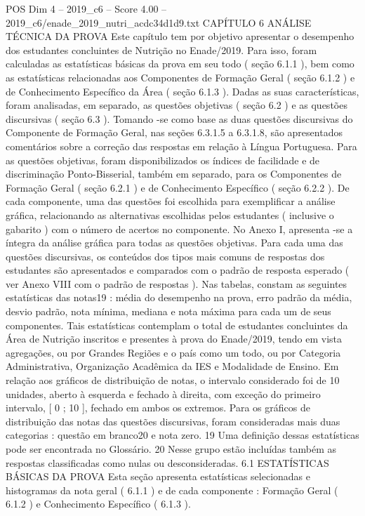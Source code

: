 \begin{textsample}{POS Dim 4 – 2019\_c6 – Score 4.00 – 2019\_c6/enade\_2019\_nutri\_acdc34d1d9.txt}  \label{ex:f4_pos_091}
CAPÍTULO 6 ANÁLISE TÉCNICA DA PROVA Este capítulo tem por objetivo apresentar o desempenho dos estudantes concluintes de Nutrição no Enade/2019.
Para isso, foram calculadas as estatísticas básicas da prova em seu todo ( seção 6.1.1 ), bem como as estatísticas relacionadas aos Componentes de Formação Geral ( seção 6.1.2 ) e de Conhecimento Específico da Área ( seção 6.1.3 ).
Dadas as suas características, foram analisadas, em separado, as questões objetivas ( seção 6.2 ) e as questões discursivas ( seção 6.3 ).
Tomando -se como base as duas questões discursivas do Componente de Formação Geral, nas seções 6.3.1.5 a 6.3.1.8, são apresentados comentários sobre a correção das respostas em relação à Língua Portuguesa.
Para as questões objetivas, foram disponibilizados os índices de facilidade e de discriminação Ponto-Bisserial, também em separado, para os Componentes de Formação Geral ( seção 6.2.1 ) e de Conhecimento Específico ( seção 6.2.2 ).
De cada componente, uma das questões foi escolhida para exemplificar a análise gráfica, relacionando as alternativas escolhidas pelos estudantes ( inclusive o gabarito ) com o número de acertos no componente.
No Anexo I, apresenta -se a íntegra da análise gráfica para todas as questões objetivas.
Para cada uma das questões discursivas, os conteúdos dos tipos mais comuns de respostas dos estudantes são apresentados e comparados com o padrão de resposta esperado ( ver Anexo VIII com o padrão de respostas ).
Nas tabelas, constam as seguintes estatísticas das notas19 : média do desempenho na prova, erro padrão da média, desvio padrão, nota mínima, mediana e nota máxima para cada um de seus componentes.
Tais estatísticas contemplam o total de estudantes concluintes da Área de Nutrição inscritos e presentes à prova do Enade/2019, tendo em vista agregações, ou por Grandes Regiões e o país como um todo, ou por Categoria Administrativa, Organização Acadêmica da IES e Modalidade de Ensino.
Em relação aos gráficos de distribuição de notas, o intervalo considerado foi de 10 unidades, aberto à esquerda e fechado à direita, com exceção do primeiro intervalo, [ 0 ; 10 ], fechado em ambos os extremos.
Para os gráficos de distribuição das notas das questões discursivas, foram consideradas mais duas categorias : questão em branco20 e nota zero. 19 Uma definição dessas estatísticas pode ser encontrada no Glossário. 20 Nesse grupo estão incluídas também as respostas classificadas como nulas ou desconsideradas. 6.1 ESTATÍSTICAS BÁSICAS DA PROVA Esta seção apresenta estatísticas selecionadas e histogramas da nota geral ( 6.1.1 ) e de cada componente : Formação Geral ( 6.1.2 ) e Conhecimento Específico ( 6.1.3 ).

\end{textsample}
